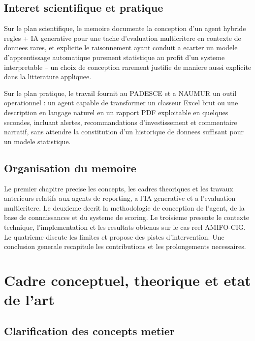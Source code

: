 \documentclass[12pt,a4paper,twoside,openany]{report}
\begin{document}
\section*{Interet scientifique et pratique}

Sur le plan scientifique, le memoire documente la conception d'un agent hybride regles + IA generative pour une tache d'evaluation multicritere en contexte de donnees rares, et explicite le raisonnement ayant conduit a ecarter un modele d'apprentissage automatique purement statistique au profit d'un systeme interpretable -- un choix de conception rarement justifie de maniere aussi explicite dans la litterature appliquee.

Sur le plan pratique, le travail fournit au PADESCE et a NAUMUR un outil operationnel : un agent capable de transformer un classeur Excel brut ou une description en langage naturel en un rapport PDF exploitable en quelques secondes, incluant alertes, recommandations d'investissement et commentaire narratif, sans attendre la constitution d'un historique de donnees suffisant pour un modele statistique.

\section*{Organisation du memoire}

Le premier chapitre precise les concepts, les cadres theoriques et les travaux anterieurs relatifs aux agents de reporting, a l'IA generative et a l'evaluation multicritere. Le deuxieme decrit la methodologie de conception de l'agent, de la base de connaissances et du systeme de scoring. Le troisieme presente le contexte technique, l'implementation et les resultats obtenus sur le cas reel AMIFO-CIG. Le quatrieme discute les limites et propose des pistes d'intervention. Une conclusion generale recapitule les contributions et les prolongements necessaires.

\newpage


\chapter{Cadre conceptuel, theorique et etat de l'art}

\section{Clarification des concepts metier}
\end{document}
